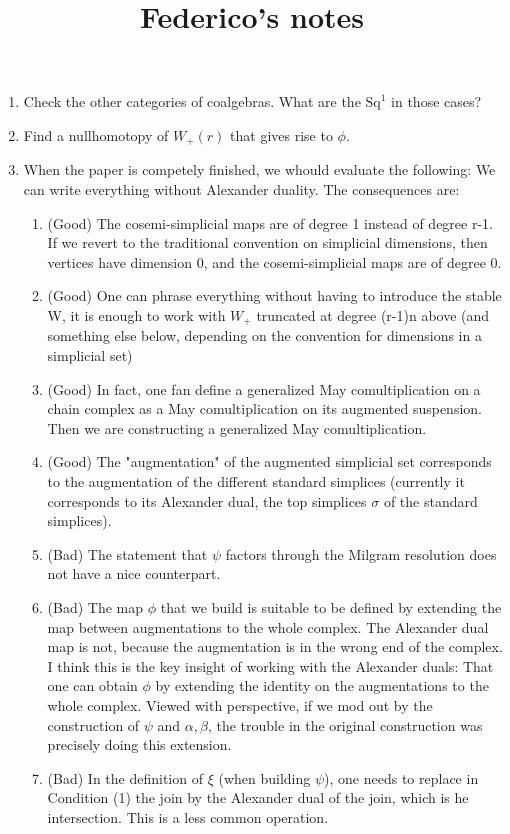 \documentclass{report}
\begin{document}
\begin{enumerate}
\begin{itemize}
			\item Bad: Nobody uses Kan spectra.
			\item Good: I like Kan spectra.
			\item Bad: The longer the section, the worse: We don't want this to be an introduction to Kan spectra.
		\end{itemize}
		\item Check the other categories of coalgebras. What are the $\mathrm{Sq}^1$ in those cases?
		\item Find a nullhomotopy of $W_+(r)$ that gives rise to $\phi$.
		\item When the paper is competely finished, we whould evaluate the following: We can write everything without Alexander duality. The consequences are:
		\begin{enumerate}
			\item (Good) The cosemi-simplicial maps are of degree 1 instead of degree r-1. If we revert to the traditional convention on simplicial dimensions, then vertices have dimension 0, and the cosemi-simplicial maps are of degree 0.
			\item (Good) One can phrase everything without having to introduce the stable W, it is enough to work with $W_+$ truncated at degree (r-1)n above (and something else below, depending on the convention for dimensions in a simplicial set)
			\item (Good) In fact, one fan define a generalized May comultiplication on a chain complex as a May comultiplication on its augmented suspension. Then we are constructing a generalized May comultiplication.
			\item (Good) The "augmentation" of the augmented simplicial set corresponds to the augmentation of the different standard simplices (currently it corresponds to its Alexander dual, the top simplices $\sigma$ of the standard simplices).
			\item (Bad) The statement that $\psi$ factors through the Milgram resolution does not have a nice counterpart.
			\item (Bad) The map $\phi$ that we build is suitable to be defined by extending the map between augmentations to the whole complex. The Alexander dual map is not, because the augmentation is in the wrong end of the complex. I think this is the key insight of working with the Alexander duals: That one can obtain $\phi$ by extending the identity on the augmentations to the whole complex. Viewed with perspective, if we mod out by the construction of $\psi$ and $\alpha,\beta$, the trouble in the original construction was precisely doing this extension.
			\item (Bad) In the definition of $\xi$ (when building $\psi$), one needs to replace in Condition (1) the join by the Alexander dual of the join, which is he intersection. This is a less common operation.
		\end{enumerate}
	\end{enumerate}\title{Federico's notes}
\end{document}

